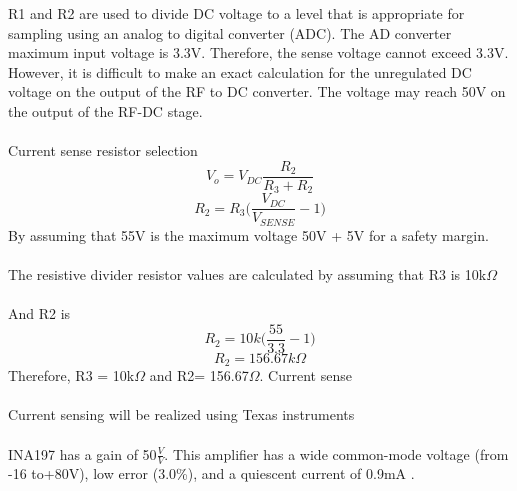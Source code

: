 \documentclass[12pt]{article}
\begin{document}
\indent
R1 and R2 are used to divide DC voltage to a level that is appropriate for sampling using an analog to digital converter (ADC). The AD converter maximum input voltage is 3.3V. Therefore, the sense voltage cannot exceed 3.3V. However,  it is difficult to make an exact calculation for the unregulated DC voltage on the output of the RF to DC converter. The voltage may reach 50V on the output of the RF-DC stage.\\
\hfill \\
Current sense resistor selection
\begin{equation}
V_o = V_{DC} \frac{R_2}{R_3 + R_2}
\end{equation}
\begin{equation}
R_2 = R_3\big(\frac{V_{DC}}{V_{SENSE}} - 1\big)
\end{equation}
By assuming that 55V is the maximum voltage  50V + 5V for a safety margin.\\
\hfill \\
The resistive divider resistor values are calculated by assuming that R3 is 10k$\Omega$\\
\hfill \\
And R2 is
\begin{equation}
R_2 = 10k\big(\frac{55}{3.3} - 1\big)
\end{equation}
\begin{equation}
R_2 = 156.67k\Omega
\end{equation}
Therefore, R3 = 10k$\Omega$ and R2= 156.67$\Omega$.
Current sense\\
\hfill \\
Current sensing will be realized using Texas instruments\\
\hfill \\
INA197 has a gain of 50$\frac{V}{V}$. This amplifier has a wide common-mode voltage (from -16 to+80V), low error (3.0\%), and a quiescent current of 0.9mA \cite{INA19x}.\\
\end{document}
